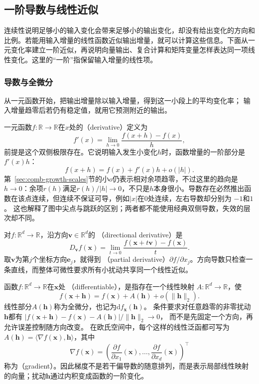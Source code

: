 \subsection{一阶导数与线性近似}
\label{sec:analysis-vector-chain-matrix-calculus}
\label{sec:analysis-derivatives-linear-approximation}
连续性说明足够小的输入变化会带来足够小的输出变化，却没有给出变化的方向和比例。若能用输入增量的线性函数近似输出增量，就可以计算这些信息。下面从一元变化率建立一阶近似，再说明向量输出、复合计算和矩阵变量怎样表达同一项线性变化。这里的“一阶”指保留输入增量的线性项。

\subsubsection{导数与全微分}

从一元函数开始，把输出增量除以输入增量，得到这一小段上的平均变化率；
输入增量趋零后若仍有稳定值，就用它预测附近的输出。

一元函数$f:\mathbb{R}\to\mathbb{R}$在$x$处的（derivative）定义为
\[   f'(x)=\lim_{h\to0}\frac{f(x+h)-f(x)}{h}, \]
前提是这个双侧极限存在。它说明输入发生小变化$h$时，函数增量的一阶部分是$f'(x)h$：
\begin{equation}
  f(x+h)=f(x)+f'(x)h+o(|h|).
\label{eq:analysis-scalar-first-order}
\end{equation}
第~\ref{sec:comb-growth-scales}节的小$o$仍表示相对余项趋零，不过这里的趋向是$h\to0$：余项$r(h)$满足$r(h)/|h|\to0$，不只是$h$本身很小。导数存在必然推出函数在该点连续，但连续不保证可导，例如$|x|$在$0$处连续，左右导数却分别为 $-1$和$1$。
这也解释了图中尖点与跳跃的区别；两者都不能使用经典双侧导数，失效的层次却不同。

对$f:\mathbb{R}^d\to\mathbb{R}$，沿方向$\bm{v}\in\mathbb{R}^d$的
（directional derivative）是
\[   D_{\bm{v}}f(\bm{x})   =   \lim_{t\to0}   \frac{f(\bm{x}+t\bm{v})-f(\bm{x})}{t}. \]
取$\bm{v}$为第$j$个坐标方向$\bm{e}_j$，就得到
（partial derivative）$\partial f/\partial x_j$。方向导数只检查一条直线，而整体可微性要求所有小扰动共享同一个线性近似。

函数$f:\mathbb{R}^d\to\mathbb{R}$在$\bm{x}$处
（differentiable），是指存在一个线性映射 $A:\mathbb{R}^d\to\mathbb{R}$，使
\begin{equation}
  f(\bm{x}+\bm{h})
  =
  f(\bm{x})+A(\bm{h})+o(\lVert\bm{h}\rVert_2).
\label{eq:analysis-total-differentiability}
\end{equation}
线性部分$A(\bm h)$称为全微分，也记为$\mathrm df_{\bm x}(\bm h)$。
条件要求对任意趋零的非零扰动$\bm h$都有
$|f(\bm x+\bm h)-f(\bm x)-A(\bm h)|/\lVert\bm h\rVert_2\to0$，
而不是先固定一个方向，再允许误差控制随方向改变。
在欧氏空间中，每个这样的线性泛函都可写为 $A(\bm{h})=\langle\nabla f(\bm{x}),\bm{h}\rangle$，其中
\[   \nabla f(\bm{x})   =   \left(     \frac{\partial f}{\partial x_1}(\bm{x}),\ldots,     \frac{\partial f}{\partial x_d}(\bm{x})   \right)^{\top} \]
称为（gradient）。因此梯度不是若干偏导数的随意排列，而是表示局部线性映射的向量；扰动$\bm{h}$通过内积变成函数的一阶变化。

